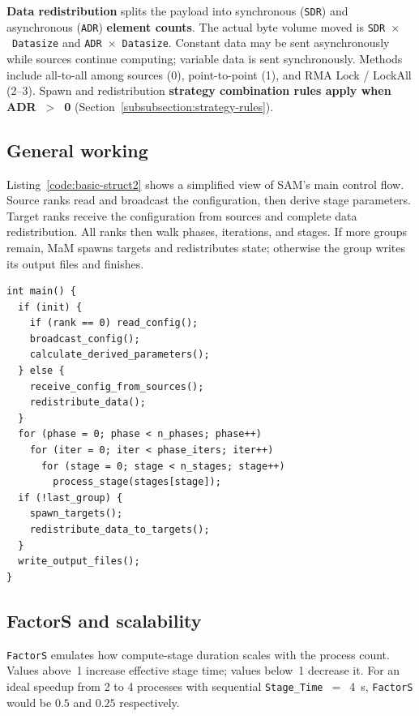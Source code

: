 \textbf{Data redistribution} splits the payload into synchronous (\texttt{SDR}) and asynchronous (\texttt{ADR}) \textbf{element counts}. The actual byte volume moved is \texttt{SDR}~$\times$~\texttt{Datasize} and \texttt{ADR}~$\times$~\texttt{Datasize}. Constant data may be sent asynchronously while sources continue computing; variable data is sent synchronously. Methods include all-to-all among sources (0), point-to-point (1), and RMA Lock / LockAll (2--3). Spawn and redistribution \textbf{strategy combination rules apply when ADR~$>$~0} (Section~\ref{subsubsection:strategy-rules}).

\subsection{General working}
\label{subsection:working}

Listing~\ref{code:basic-struct2} shows a simplified view of SAM's main control flow. Source ranks read and broadcast the configuration, then derive stage parameters. Target ranks receive the configuration from sources and complete data redistribution. All ranks then walk phases, iterations, and stages. If more groups remain, MaM spawns targets and redistributes state; otherwise the group writes its output files and finishes.

\begin{lstlisting}[style=mamstyle, numbers=none, float, caption={Basic skeleton of the synthetic application.}, label=code:basic-struct2, captionpos=b]
int main() {
  if (init) {
    if (rank == 0) read_config();
    broadcast_config();
    calculate_derived_parameters();
  } else {
    receive_config_from_sources();
    redistribute_data();
  }
  for (phase = 0; phase < n_phases; phase++)
    for (iter = 0; iter < phase_iters; iter++)
      for (stage = 0; stage < n_stages; stage++)
        process_stage(stages[stage]);
  if (!last_group) {
    spawn_targets();
    redistribute_data_to_targets();
  }
  write_output_files();
}
\end{lstlisting}

\subsection{FactorS and scalability}
\label{subsection:factors}

\texttt{FactorS} emulates how compute-stage duration scales with the process count. Values above~1 increase effective stage time; values below~1 decrease it. For an ideal speedup from 2 to 4 processes with sequential \texttt{Stage\_Time}~$=$~4~s, \texttt{FactorS} would be $0.5$ and $0.25$ respectively.

